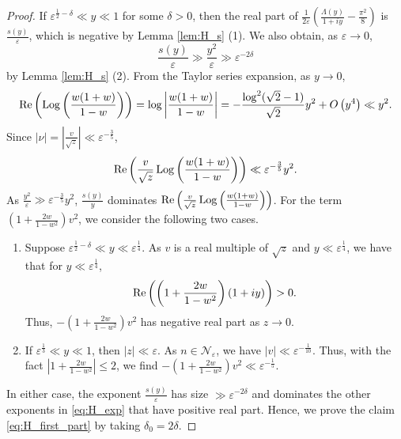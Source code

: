 \documentclass[11pt,reqno]{amsart}
\theoremstyle{remark}
\numberwithin{equation}{section}
\def\Log{\operatorname{Log}}
\renewcommand{\Re}{{\rm Re}}
\renewcommand{\Re}{{\rm Re}}
\def\Log{\operatorname{Log}}
\begin{document}
\begin{proof}
If $\varepsilon^{\frac12-\delta} \ll y \ll 1$ for some $\delta>0$, then %
the real part of $\frac{1}{2\varepsilon}\left(\frac{\Lambda(y)}{1+iy}-\frac{\pi^2}{8}\right)$ is $\frac{s(y)}{\varepsilon}$, which is negative by Lemma \ref{lem:H_s} (1). We also obtain, as $\varepsilon \to 0$, 
\[
	\frac{s(y)}{\varepsilon} \gg \frac{y^2}{\varepsilon} \gg \varepsilon^{-2\delta}
\]
by Lemma \ref{lem:H_s} (2). 
From the Taylor series expansion, as $y \to 0$, 
\[
	\Re\left( \Log\left(\frac{w(1+w)}{1-w}\right) \right) = \log \left|\frac{w(1+w)}{1-w} \right| = -\frac{\log^2(\sqrt{2}-1)}{\sqrt{2}} y^2 + O\left(y^4\right) \ll y^2.
\]
Since $|\nu|=\left|\frac{v}{\sqrt{z}}\right| \ll \varepsilon^{-\frac35}$, 
\[
	\Re\left( \frac{v}{\sqrt{z}} \Log\left(\frac{w(1+w)}{1-w}\right) \right) \ll \varepsilon^{-\frac35} y^2.
\]	
As $\frac{y^2}{\varepsilon} \gg \varepsilon^{-\frac35} y^2$, $\frac{s(y)}{y}$ dominates $\Re\left( \frac{v}{\sqrt{z}} \Log\left(\frac{w(1+w)}{1-w}\right) \right)$. For the term $\left(1+\frac{2w}{1-w^2}\right)v^2$, we consider the following two cases.
\begin{enumerate}
	\item Suppose $\varepsilon^{\frac12-\delta} \ll y \ll \varepsilon^{\frac14}$. As $v$ is a real multiple of $\sqrt{z}$ and $y\ll \varepsilon^{\frac14}$, we have that for $y \ll \varepsilon^{\frac14}$,
	\[
		\Re \left(\left(1+\frac{2w}{1-w^2}\right) (1+iy)\right) >0.
	\]
	Thus,  $-\left(1+\frac{2w}{1-w^2}\right)v^2$ has negative real part as $z\to 0$.
	
	\item If $\varepsilon^{\frac13} \ll y \ll 1$, then $|z|\ll \varepsilon$. As $n \in \mathcal{N}_{\varepsilon}$, we have $|v|\ll \varepsilon^{-\frac1{10}}$. Thus, with the fact  $\left|1+\frac{2w}{1-w^2}\right| \leq 2$, we find $-\left(1+\frac{2w}{1-w^2}\right)v^2 \ll  \varepsilon^{-\frac15}$. 
\end{enumerate}
In either case, the exponent $\frac{s(y)}{\varepsilon}$ has size $\gg \varepsilon^{-2\delta}$ and dominates the other exponents in \eqref{eq:H_exp} that have positive real part. Hence, we prove the claim \eqref{eq:H_first_part} by taking $\delta_0=2\delta$.



\end{proof}
\end{document}
